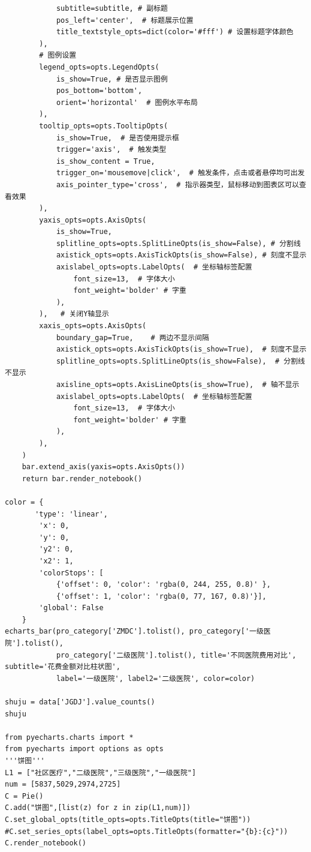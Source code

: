 \documentclass[12pt]{article}
\begin{document}
\begin{lstlisting}
            subtitle=subtitle, # 副标题
            pos_left='center',  # 标题展示位置
            title_textstyle_opts=dict(color='#fff') # 设置标题字体颜色
        ),
        # 图例设置
        legend_opts=opts.LegendOpts(
            is_show=True, # 是否显示图例
            pos_bottom='bottom',
            orient='horizontal'  # 图例水平布局
        ),
        tooltip_opts=opts.TooltipOpts(
            is_show=True,  # 是否使用提示框
            trigger='axis',  # 触发类型
            is_show_content = True,
            trigger_on='mousemove|click',  # 触发条件，点击或者悬停均可出发
            axis_pointer_type='cross',  # 指示器类型，鼠标移动到图表区可以查看效果
        ),
        yaxis_opts=opts.AxisOpts(
            is_show=True,
            splitline_opts=opts.SplitLineOpts(is_show=False), # 分割线
            axistick_opts=opts.AxisTickOpts(is_show=False), # 刻度不显示
            axislabel_opts=opts.LabelOpts(  # 坐标轴标签配置
                font_size=13,  # 字体大小
                font_weight='bolder' # 字重
            ),
        ),   # 关闭Y轴显示
        xaxis_opts=opts.AxisOpts(
            boundary_gap=True,    # 两边不显示间隔
            axistick_opts=opts.AxisTickOpts(is_show=True),  # 刻度不显示
            splitline_opts=opts.SplitLineOpts(is_show=False),  # 分割线不显示
            axisline_opts=opts.AxisLineOpts(is_show=True),  # 轴不显示
            axislabel_opts=opts.LabelOpts(  # 坐标轴标签配置
                font_size=13,  # 字体大小
                font_weight='bolder' # 字重
            ),
        ),
    )
    bar.extend_axis(yaxis=opts.AxisOpts())
    return bar.render_notebook()

color = {
       'type': 'linear',
        'x': 0,
        'y': 0,
        'y2': 0,
        'x2': 1,
        'colorStops': [
            {'offset': 0, 'color': 'rgba(0, 244, 255, 0.8)' },
            {'offset': 1, 'color': 'rgba(0, 77, 167, 0.8)'}],
        'global': False
    }
echarts_bar(pro_category['ZMDC'].tolist(), pro_category['一级医院'].tolist(),
            pro_category['二级医院'].tolist(), title='不同医院费用对比', subtitle='花费金额对比柱状图',
            label='一级医院', label2='二级医院', color=color)

shuju = data['JGDJ'].value_counts()
shuju

from pyecharts.charts import *
from pyecharts import options as opts
'''饼图'''
L1 = ["社区医疗","二级医院","三级医院","一级医院"]
num = [5837,5029,2974,2725]
C = Pie()
C.add("饼图",[list(z) for z in zip(L1,num)])
C.set_global_opts(title_opts=opts.TitleOpts(title="饼图"))
#C.set_series_opts(label_opts=opts.TitleOpts(formatter="{b}:{c}"))
C.render_notebook()


\end{lstlisting}
\end{document}
